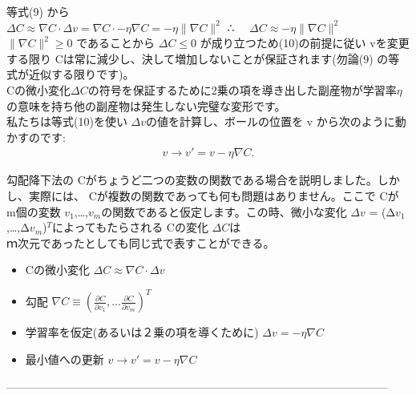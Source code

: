 \documentclass[11pt,a4j,fleqn]{jarticle}
\begin{document}
等式(9) から\\
\hspace{1.0cm} $ \Delta C \approx \nabla C \cdot \Delta v = \nabla C \cdot -\eta \nabla C =  -\eta \|\nabla C\|^2$
\hspace{1.0cm} ∴　 $\Delta C \approx -\eta \|\nabla C\|^2$ \\
$\|
\nabla C \|^2 \geq 0$ であることから $\Delta C \leq 0$ が成り立つため(10)の前提に従い vを変更する限り Cは常に減少し、決して増加しないことが保証されます(勿論(9) の等式が近似する限りです)。\\
  Cの微小変化$\Delta C$の符号を保証するために2乗の項を導き出した副産物が学習率$\eta$の意味を持ち他の副産物は発生しない完璧な変形です。\\
私たちは等式(10)を使い $\Delta v$の値を計算し、ボールの位置を v から次のように動かすのです:\\
\begin{eqnarray}
  v \rightarrow v' = v -\eta \nabla C.
\end{eqnarray}


勾配降下法の Cがちょうど二つの変数の関数である場合を説明しました。しかし、実際には、 Cが複数の関数であっても何も問題はありません。ここで Cが m個の変数 $v_1$,…,$v_m$の関数であると仮定します。この時、微小な変化 $\Delta v$ = (Δ$v_1$,…,Δ$v_m$)$^T$によってもたらされる Cの変化 $\Delta C$は\\
ｍ次元であったとしても同じ式で表すことができる。\\
\begin{itemize}
 \item  Cの微小変化\hspace{0.5cm} $ \Delta C \approx \nabla C \cdot \Delta v$
 \item  勾配 \hspace{0.5cm}  $\nabla C \equiv \left(\frac{\partial C}{\partial v_1}, \ldots \frac{\partial C}{\partial v_m}\right)^T$
 \item  学習率を仮定(あるいは２乗の項を導くために) \hspace{0.5cm} $\Delta v = -\eta \nabla C$
 \item  最小値への更新\hspace{0.5cm} $v \rightarrow v' = v-\eta \nabla C$
\end{itemize}
------------------------------------------------------------------------------------------------------\\
\end{document}
